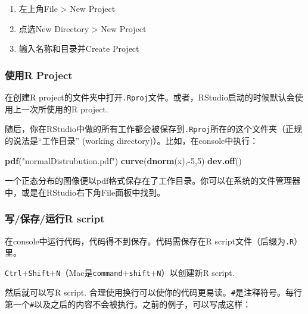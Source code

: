 \documentclass[]{book}
\newenvironment{Shaded}{\begin{snugshade}}{\end{snugshade}}
\newcommand{\DecValTok}[1]{\textcolor[rgb]{0.00,0.00,0.81}{#1}}
\newcommand{\KeywordTok}[1]{\textcolor[rgb]{0.13,0.29,0.53}{\textbf{#1}}}
\newcommand{\NormalTok}[1]{#1}
\newcommand{\OperatorTok}[1]{\textcolor[rgb]{0.81,0.36,0.00}{\textbf{#1}}}
\newcommand{\StringTok}[1]{\textcolor[rgb]{0.31,0.60,0.02}{#1}}
\providecommand{\tightlist}{%
  \setlength{\itemsep}{0pt}\setlength{\parskip}{0pt}}
\begin{document}
\begin{enumerate}
\def\labelenumi{\arabic{enumi}.}
\tightlist
\item
  左上角File \textgreater{} New Project
\item
  点选New Directory \textgreater{} New Project
\item
  输入名称和目录并Create Project
\end{enumerate}

\hypertarget{project-use}{%
\subsubsection{使用R Project}\label{project-use}}

在创建R project的文件夹中打开\texttt{.Rproj}文件。或者，RStudio启动的时候默认会使用上一次所使用的R project.

随后，你在RStudio中做的所有工作都会被保存到\texttt{.Rproj}所在的这个文件夹（正规的说法是``工作目录'' (working directory)）。比如，在console中执行：

\begin{Shaded}
\begin{Highlighting}[]
\KeywordTok{pdf}\NormalTok{(}\StringTok{"normalDistrubution.pdf"}\NormalTok{)}
\KeywordTok{curve}\NormalTok{(}\KeywordTok{dnorm}\NormalTok{(x),}\OperatorTok{-}\DecValTok{5}\NormalTok{,}\DecValTok{5}\NormalTok{)}
\KeywordTok{dev.off}\NormalTok{()}
\end{Highlighting}
\end{Shaded}

一个正态分布的图像便以pdf格式保存在了工作目录。你可以在系统的文件管理器中，或是在RStudio右下角File面板中找到。

\hypertarget{Rscript}{%
\subsubsection{写/保存/运行R script}\label{Rscript}}

在console中运行代码，代码得不到保存。代码需保存在R script文件（后缀为\texttt{.R}）里。

\texttt{Ctrl}+\texttt{Shift}+\texttt{N}（Mac是\texttt{command}+\texttt{shift}+\texttt{N}）以创建新R script.

然后就可以写R script. 合理使用换行可以使你的代码更易读。\texttt{\#}是注释符号。每行第一个\texttt{\#}以及之后的内容不会被执行。之前的例子，可以写成这样：
\end{document}
